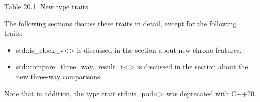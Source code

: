 \begin{center}
Table 20.1. New type traits
\end{center}

The following sections discuss these traits in detail, except for the following traits:

\begin{itemize}
\item 
std::is\_clock\_v<> is discussed in the section about new chrono features.

\item 
std::compare\_three\_way\_result\_t<> is discussed in the section about the new three-way comparisons.
\end{itemize}

Note that in addition, the type trait std::is\_pod<> was deprecated with C++20.












